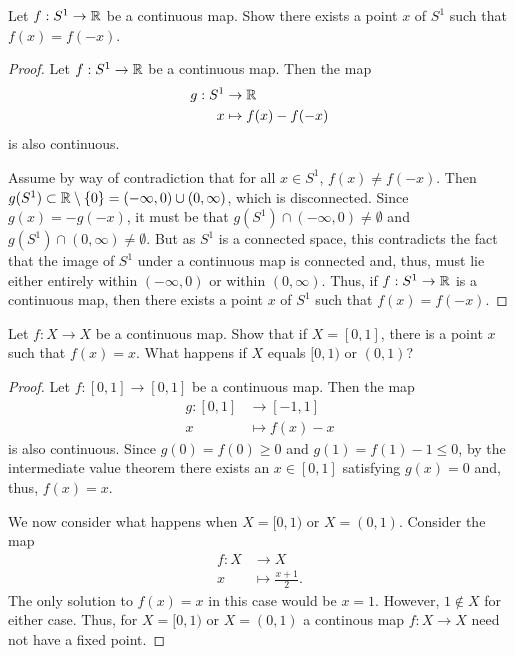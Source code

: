 \begin{exercise}[ID=3.24.2]
  Let $f: S^1 \rightarrow \mathbb{R}$ be a continuous map.
  Show there exists a point $x$ of $S^1$ such that $f(x) = f(-x)$.
\end{exercise}
%
\begin{solution}
  \begin{proof}
    Let $f: S^1 \rightarrow \mathbb{R}$ be a continuous map.
    Then the map
    \begin{align*}
      g: S^1  &\rightarrow \mathbb{R} \\
            x &\mapsto f(x) - f(-x)
    \end{align*}
    is also continuous.

    Assume by way of contradiction that for all $x \in S^1$, $f(x) \neq f(-x)$.
    Then $g(S^1) \subset \mathbb{R} \setminus \{0\} = (-\infty, 0) \cup (0, \infty)$, which is disconnected.
    Since $g(x) = -g(-x)$, it must be that $g(S^1) \cap (-\infty, 0) \neq \emptyset$ and $g(S^1) \cap (0, \infty) \neq \emptyset$.
    But as $S^1$ is a connected space, this contradicts the fact that the image of $S^1$ under a continuous map is connected and, thus, must lie either entirely within $(-\infty, 0)$ or within $(0, \infty)$.
    Thus, if $f: S^1 \rightarrow \mathbb{R}$ is a continuous map, then there exists a point $x$ of $S^1$ such that $f(x) = f(-x)$.
  \end{proof}
\end{solution}
\newpage

\begin{exercise}[ID=3.24.3]
  Let $f: X \rightarrow X$ be a continuous map.
  Show that if $X = [0, 1]$, there is a point $x$ such that $f(x) = x$.
  What happens if $X$ equals $[0, 1)$ or $(0, 1)$?
\end{exercise}
%
\begin{solution}
  \begin{proof}
    Let $f: [0, 1] \rightarrow [0, 1]$ be a continuous map.
    Then the map
    \begin{align*}
      g: [0, 1] &\rightarrow [-1, 1] \\
              x &\mapsto f(x) - x
    \end{align*}
    is also continuous.
    Since $g(0) = f(0) \geq 0$ and $g(1) = f(1) - 1 \leq 0$, by the intermediate value theorem there exists an $x \in [0, 1]$ satisfying $g(x) = 0$ and, thus, $f(x) = x$.

    We now consider what happens when $X = [0, 1)$ or $X = (0, 1)$.
    Consider the map
    \begin{align*}
      f: X  &\rightarrow X \\
         x  &\mapsto \frac{x + 1}{2}.
    \end{align*}
    The only solution to $f(x) = x$ in this case would be $x = 1$.
    However, $1 \not\in X$ for either case.
    Thus, for $X = [0, 1)$ or $X = (0, 1)$ a continous map $f: X \rightarrow X$ need not have a fixed point.
  \end{proof}
\end{solution}
\newpage

